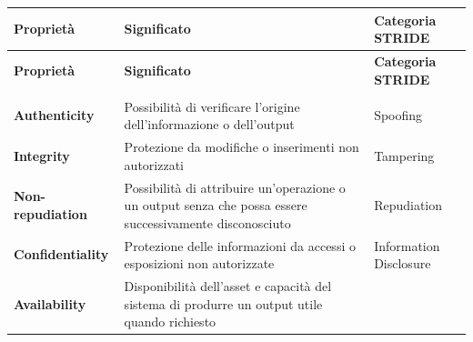 {
\small
{}
\setlength{\tabcolsep}{4pt}
\renewcommand{\arraystretch}{1.08}

\begin{xltabular}{\textwidth}{
    >{\raggedright\arraybackslash}p{2.8cm}
    X
    >{\raggedright\arraybackslash}p{3.8cm}
}

\toprule

\textbf{Proprietà} &
\textbf{Significato} &
\textbf{Categoria STRIDE} \\

\midrule

\endfirsthead

\toprule

\textbf{Proprietà} &
\textbf{Significato} &
\textbf{Categoria STRIDE} \\

\midrule

\endhead

 \\
\endfoot

\endlastfoot


\textbf{Authenticity} &

Possibilità di verificare l'origine dell'informazione o dell'output &

Spoofing \\

\midrule


\textbf{Integrity} &

Protezione da modifiche o inserimenti non autorizzati &

Tampering \\

\midrule


\textbf{Non-repudiation} &

Possibilità di attribuire un'operazione o un output senza che possa essere
successivamente disconosciuto &

Repudiation \\

\midrule


\textbf{Confidentiality} &

Protezione delle informazioni da accessi o esposizioni non autorizzate &

Information Disclosure \\

\midrule


\textbf{Availability} &

Disponibilità dell'asset e capacità del sistema di produrre un output utile
quando richiesto &


\end{xltabular}}
